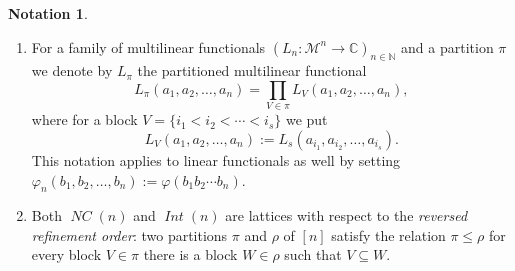 \documentclass[12pt]{amsart}
\DeclareMathOperator{\IntPart}{\mathit{Int}}
\newcommand\IN{{\mathbb N}}
\newcommand\bub[1]{\mathring{#1}}
\DeclareMathOperator{\NC}{\mathit{NC}} %
\newcommand{\alg}[1]{\mathcal{#1}}
\theoremstyle{definition}
\newtheorem{notation}[theorem]{Notation}
\numberwithin{equation}{section}
\begin{document}
\begin{notation}
\begin{enumerate}[label=(\roman*), leftmargin=2em]
   \item  For a family of multilinear functionals
    $(L_n:\alg{M}^n\to\mathbb{C})_{n\in\IN}$ and a partition $\pi$ we denote by  
    $L_\pi$ the partitioned multilinear functional
    $$
    L_\pi(a_1,a_2,\dots,a_n) = \prod_{V\in\pi} L_{V}( a_1,a_2,\ldots,a_n),
    $$
    where for a block $V = \{i_1<i_2<\cdots <i_s\}$
    we put
    $$
    L_{V}( a_1,a_2,\ldots,a_n)    := L_s(a_{i_1},a_{i_2},\ldots,a_{i_s}).
    $$
    This notation applies to linear functionals as well by setting
     $\varphi_n(b_1,b_2,\ldots,b_n):=\varphi(b_1b_2\cdots b_n).$ 
   \item Both $\NC(n)$ and $\IntPart(n)$ are lattices with respect to
    the \emph{reversed refinement order}:
    two partitions $\pi$ and $\rho$ of $[n]$ satisfy the relation $\pi\leq\rho$ 
    for every block $V\in\pi$ there is a block $W\in\rho$ such that $V\subseteq W$. 
  \end{enumerate}
\end{notation}
\end{document}
